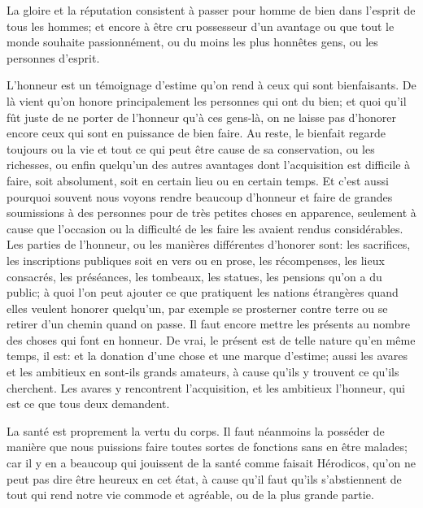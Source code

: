 \bigbreak

La gloire et la réputation consistent à passer pour homme de bien dans l'esprit de tous les hommes; et encore à être cru possesseur
d'un avantage ou que tout le monde souhaite passionnément, ou du moins les plus honnêtes gens, ou les personnes d'esprit. 

L'honneur est un témoignage d'estime qu'on rend à ceux qui sont bienfaisants. De là vient qu'on honore principalement les personnes
qui ont du bien; et quoi qu'il fût juste de ne porter de l'honneur qu'à ces gens-là, on ne laisse pas d'honorer encore ceux qui sont
en puissance de bien faire. Au reste, le bienfait regarde toujours ou la vie et tout ce qui peut être cause de sa conservation, ou les
richesses, ou enfin quelqu'un des autres avantages dont l'acquisition est difficile à faire, soit absolument, soit en certain lieu ou
en certain temps. Et c'est aussi pourquoi souvent nous voyons rendre beaucoup d'honneur et faire de grandes soumissions à des personnes
pour de très petites choses en apparence, seulement à cause que l'occasion ou la difficulté de les faire les avaient rendus considérables.
Les parties de l'honneur, ou les manières différentes d'honorer sont: les sacrifices, les inscriptions publiques soit en vers ou en prose,
les récompenses, les lieux consacrés, les préséances, les tombeaux, les statues, les pensions qu'on a du public; à quoi l'on peut ajouter
ce que pratiquent les nations étrangères quand elles veulent honorer quelqu'un, par exemple se prosterner contre terre ou se retirer d'un
chemin quand on passe. Il faut encore mettre les présents au nombre des choses qui font en honneur. De vrai, le présent est de telle nature
qu'en même temps, il est: et la donation d'une chose et une marque d'estime; aussi les avares et les ambitieux en sont-ils grands amateurs,
à cause qu'ils y trouvent ce qu'ils cherchent. Les avares y rencontrent l'acquisition, et les ambitieux l'honneur, qui est ce que tous deux
demandent. 

\bigbreak

La santé est proprement la vertu du corps. Il faut néanmoins la posséder de manière que nous puissions faire toutes sortes
de fonctions sans en être malades; car il y en a beaucoup qui jouissent de la santé comme faisait Hérodicos, qu'on ne peut
pas dire être heureux en cet état, à cause qu'il faut qu'ils s'abstiennent de tout qui rend notre vie commode et agréable,
ou de la plus grande partie.

\bigbreak

